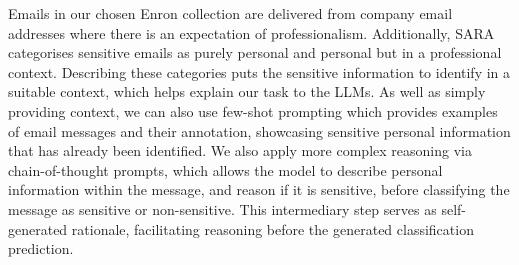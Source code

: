 Emails in our chosen Enron collection are delivered from company email addresses where there is an expectation of professionalism. Additionally, SARA categorises sensitive emails as purely personal and personal but in a professional context. Describing these categories puts the sensitive information to identify in a suitable context, which helps explain our task to the LLMs. As well as simply providing context, we can also use few-shot prompting which provides examples of email messages and their annotation, showcasing sensitive personal information that has already been identified. We also apply more complex reasoning via chain-of-thought prompts, which allows the model to describe personal information within the message, and reason if it is sensitive, before classifying the message as sensitive or non-sensitive. This intermediary step serves as self-generated rationale, facilitating reasoning before the generated classification prediction.


